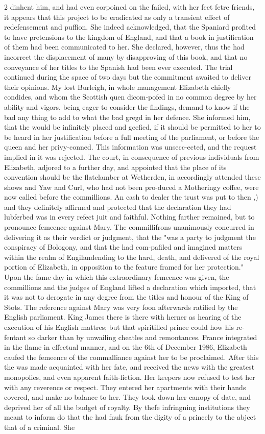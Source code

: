 \documentclass[10pt]{article}
\begin{document}
\begin{multicols}{2}
dinhent him, and had even corpoined on the failed, with her feet fetre friends, it appears that this project to be eradicated as only a transient effect of redefensement and puffion. She indeed acknowledged, that the Spaniard profited to have pretensions to the kingdom of England, and that a book in justification of them had been communicated to her. She declared, however, thus the had incorrect the displacement of many by disapproving of this book, and that no conveyance of her titles to the Spanish had been ever executed. The trial continued during the space of two days but the commitment awaited to deliver their opinions. My lost Burleigh, in whole management Elizabeth chiefly condides, and whom the Scottish quen dicom-pofed in no common degree by her ability and vigors, being eager to consider the findings, demand to know if the bad any thing to add to what the bad gregd in her defence. She informed him, that the would be infinitely placed and geefied, if it should be permitted to her to be heard in her justification before a full meeting of the parliament, or before the queen and her privy-conned. This information was unsecc-ected, and the request implied in it was rejected. The court, in consequence of previous individuals from Elizabeth, adjored to a further day, and appointed that the place of its convention should be the flatclamber at Wetherden, in accordingly attended these shows and Yaw and Curl, who had not been pro-duced a Motheringy coffee, were now called before the commillions. An cash to dealer the trust was put to then ,) and they definitely affirmed and protected that the declaration they had lubferbed was in every refect juit and faithful. Nothing farther remained, but to pronounce femeence against Mary. The commillifrons unanimously concurred in delivering it as their verdict or judgment, that the "was a party to judgment the conspiracy of Bologony, and that the had com-pafiled and imagined matters within the realm of Engilandending to the hard, death, and delivered of the royal portion of Elizabeth, in opposition to the feature framed for her protection." Upon the fame day in which this extraordinary femeence was given, the commillions and the judges of England lifted a declaration which imported, that it was not to derogate in any degree from the titles and honour of the King of Stots. The reference against Mary was very foon afterwards ratified by the English parliament. King James there is there with herner as hearing of the execution of his English mattres; but that spiritilled prince could how his re-fentant so darker than by unwailing cheatles and remontances. France integrated in the flame in effectual manner, and on the 6th of December 1986, Elizabeth caufed the femeence of the commalliance against her to be proclaimed. After this the was made acquainted with her fate, and received the news with the greatest monopolies, and even apparent faith-fiction. Her keepers now refused to test her with any reverence or respect. They entered her apartments with their hands covered, and make no balance to her. They took down her canopy of date, and deprived her of all the budget of royalty. By thefe infringning institutions they meant to inform do that the had fnuk from the digity of a princely to the abject that of a criminal. She 
\end{multicols}
\end{document}

